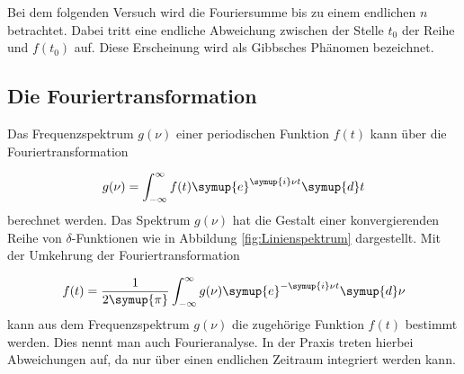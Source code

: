 Bei dem folgenden Versuch wird die Fouriersumme bis zu einem endlichen
$n$ betrachtet. Dabei tritt eine endliche Abweichung zwischen der Stelle $t_0$
der Reihe und $f(t_0)$ auf. Diese Erscheinung wird als Gibbsches Phänomen
bezeichnet.

\subsection{Die Fouriertransformation}

Das Frequenzspektrum $g(\nu)$ einer periodischen Funktion $f(t)$ kann über
die Fouriertransformation

\begin{equation}
  g(\nu) = \int_{-\infty}^{\infty} f(t) \symup{e}^{\symup{i}\nu t} \symup{d}t
\end{equation}
berechnet werden.
Das Spektrum $g(\nu)$ hat die Gestalt einer konvergierenden Reihe von
$\delta$-Funktionen wie in Abbildung \ref{fig:Linienspektrum} dargestellt.
Mit der Umkehrung der Fouriertransformation

\begin{equation}
  f(t) = \frac{1}{2\symup{\pi}} \int_{-\infty}^{\infty} g(\nu) \symup{e}^{
  -\symup{i}\nu t} \symup{d} \nu
\end{equation}
kann aus dem Frequenzspektrum $g(\nu)$ die zugehörige Funktion $f(t)$ bestimmt
werden. Dies nennt man auch Fourieranalyse.
In der Praxis treten hierbei Abweichungen auf, da nur über einen endlichen
Zeitraum integriert werden kann.
\cite{sample}
